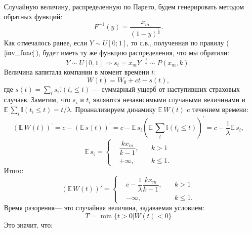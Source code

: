 \documentclass[oneside, final, 12pt]{article}
\def\E{{\mathbb{E} }\,}
\begin{document}
	Случайную величину, распределенную по Парето, будем генерировать методом обратных функций:
	\begin{equation}
		F^{-1}(y) = \frac{x_m}{{(1-y)}^{\frac{1}{k}}}. \label{inv_func}
	\end{equation}
	Как отмечалось ранее, если $Y\sim U[0;1]$, то с.в., полученная по правилу ($\ref{inv_func}$), будет
	иметь ту же функцию распределения, что мы обратили:
	$$ Y \sim U[0,1] \Rightarrow s_i = x_m Y^{-\frac{1}{k}} \sim P(x_m,k).$$
	Величина капитала компании в момент времени $t$:
	$$W(t) = W_0 + ct - s(t),$$
	где $s(t) = \sum\limits_{i} s_i \mathbb{I}(t_i\leqslant t)$ --- суммарный ущерб 
	от наступивших страховых случаев.
	\newline Заметим, что  $s_i$ и $t_i$ являются независимыми случаными величинами и 
		$\E \sum\limits_{i}\mathbb{I}(t_i\leqslant t) = t \slash \lambda $.
	\newpage \noindent
	Проанализируем динамику $\E  W(t)$ c течением времени: 
	$$(\E  W(t))^{\prime}= c - (\E  s(t))^{\prime} = c 
			- \E  s_i \left(\E  \sum\limits_{i}\mathbb{I}(t_i\leqslant t) \right)^{\prime}=
			 c - \frac{1}{\lambda}\E  s_i, $$
	$$ 
		\E  s_i = \left \{
										\begin{aligned}
											&\dfrac{k x_m}{k-1}, \quad & k>1 \\
											& +\infty, & k \leqslant 1.
										\end{aligned}
									\right.
	$$
	\noindent
	Итого:
	$$ 
		(\E  W(t))' = \left \{
										\begin{aligned}
											& c - \dfrac{1}{\lambda}\dfrac{k x_m}{k-1}, \quad & k>1 \\
											& -\infty, & k \leqslant 1.
										\end{aligned}
									\right.
	$$
	Время разорения--- это случайная величина, задаваемая условием:
	$$ T = \min\{t>0| W(t)<0\}$$
	Это значит, что: 
\end{document}
